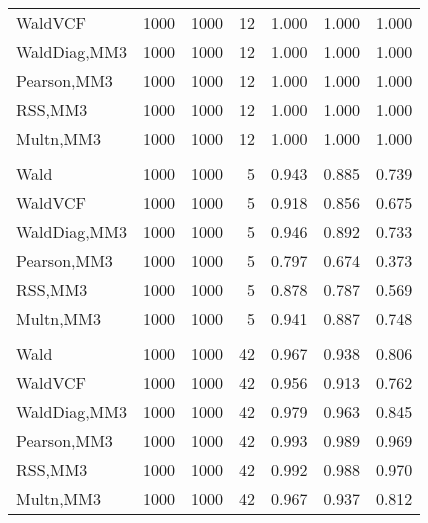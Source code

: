 \documentclass[
]{article}
\begin{document}
\begin{table}[H]
{\begin{tabular}[t]{lrrrrrr}
\hspace{1em}WaldVCF & 1000 & 1000 & 12 & 1.000 & 1.000 & 1.000\\
\hspace{1em}WaldDiag,MM3 & 1000 & 1000 & 12 & 1.000 & 1.000 & 1.000\\
\hspace{1em}Pearson,MM3 & 1000 & 1000 & 12 & 1.000 & 1.000 & 1.000\\
\hspace{1em}RSS,MM3 & 1000 & 1000 & 12 & 1.000 & 1.000 & 1.000\\
\hspace{1em}Multn,MM3 & 1000 & 1000 & 12 & 1.000 & 1.000 & 1.000\\
\addlinespace[0.3em]
\multicolumn{7}{l}{\textbf{2F 10V}}\\
\hspace{1em}Wald & 1000 & 1000 & 5 & 0.943 & 0.885 & 0.739\\
\hspace{1em}WaldVCF & 1000 & 1000 & 5 & 0.918 & 0.856 & 0.675\\
\hspace{1em}WaldDiag,MM3 & 1000 & 1000 & 5 & 0.946 & 0.892 & 0.733\\
\hspace{1em}Pearson,MM3 & 1000 & 1000 & 5 & 0.797 & 0.674 & 0.373\\
\hspace{1em}RSS,MM3 & 1000 & 1000 & 5 & 0.878 & 0.787 & 0.569\\
\hspace{1em}Multn,MM3 & 1000 & 1000 & 5 & 0.941 & 0.887 & 0.748\\
\addlinespace[0.3em]
\multicolumn{7}{l}{\textbf{3F 15V}}\\
\hspace{1em}Wald & 1000 & 1000 & 42 & 0.967 & 0.938 & 0.806\\
\hspace{1em}WaldVCF & 1000 & 1000 & 42 & 0.956 & 0.913 & 0.762\\
\hspace{1em}WaldDiag,MM3 & 1000 & 1000 & 42 & 0.979 & 0.963 & 0.845\\
\hspace{1em}Pearson,MM3 & 1000 & 1000 & 42 & 0.993 & 0.989 & 0.969\\
\hspace{1em}RSS,MM3 & 1000 & 1000 & 42 & 0.992 & 0.988 & 0.970\\
\hspace{1em}Multn,MM3 & 1000 & 1000 & 42 & 0.967 & 0.937 & 0.812\\
\bottomrule
\end{tabular}}
\endgroup{}
\end{table}
\end{document}
